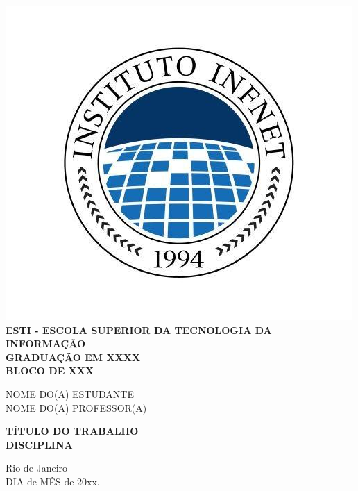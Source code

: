 \documentclass[a4paper, 12pt]{article} %
\begin{document}
\begin{center}

  \includegraphics[scale=1]{logo-infnet.png}\\
  \large
  \textbf{ESTI - ESCOLA SUPERIOR DA TECNOLOGIA DA INFORMAÇÃO}\\
  \textbf{GRADUAÇÃO EM XXXX}\\
  \textbf{BLOCO DE XXX}
  
  \vspace{6.5cm}
  NOME DO(A) ESTUDANTE \\
  NOME DO(A) PROFESSOR(A)

  \vspace{4.5cm}
  \textbf{TÍTULO DO TRABALHO}\\
  \textbf{DISCIPLINA}

  \vspace{3cm}
  Rio de Janeiro \\
  DIA de MÊS de 20xx.

  \thispagestyle{empty}

\end{center}
\newpage

\onehalfspacing
\end{document}
